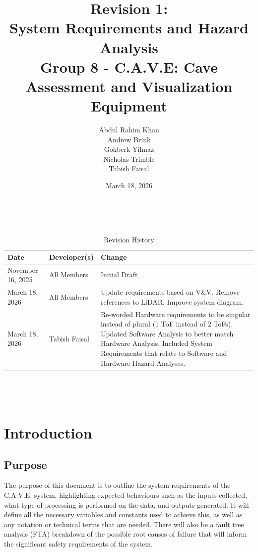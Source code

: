 \documentclass[11pt]{article}
\title{\textbf{Revision 1: \\System Requirements and Hazard Analysis \\ \large Group 8 - C.A.V.E: Cave Assessment and Visualization Equipment}}
\author{Abdul Rahim Khan \\ Andrew Brink \\ Gokberk Yilmaz \\ Nicholas Trimble \\ Tabish Faisal}
\date{March 18, 2026}
\begin{document}
\maketitle

~\newpage

\setcounter{table}{-1}
	\begin{table}[hp]
		\caption{Revision History} \label{TblRevisionHistory}
		\begin{tabularx}{\textwidth}{llX}
			\toprule
			\textbf{Date} & \textbf{Developer(s)} & \textbf{Change}\\
			\midrule
			November 16, 2025 & All Members & Initial Draft\\
            \midrule
            March 18, 2026 & All Members & Update requirements based on V\&V. Remove references to LiDAR. Improve system diagram. \\
            \midrule
            March 18, 2026 & Tabish Faisal & Re-worded Hardware requirements to be singular instead of plural (1 ToF instead of 2 ToFs). Updated Software Analysis to better match Hardware Analysis. Included System Requirements that relate to Software and Hardware Hazard Analyses. \\
			\bottomrule
		\end{tabularx}
	\end{table}

~\newpage

\tableofcontents

~\newpage

\setcounter{table}{0}

	\section{Introduction}
		\subsection{Purpose}
		
		The purpose of this document is to outline the system requirements of the C.A.V.E. system, highlighting expected behaviours such as the inputs collected, what type of processing is performed on the data, and outputs generated. It will define all the necessary variables and constants used to achieve this, as well as any notation or technical terms that are needed. There will also be a fault tree analysis (FTA) breakdown of the possible root causes of failure that will inform the significant safety requirements of the system. 
		
\end{document}
